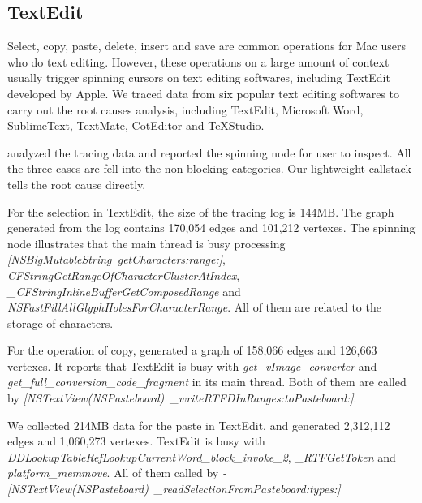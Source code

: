 \subsection{TextEdit}

Select, copy, paste, delete, insert and save are common operations for Mac
users who do text editing. However, these operations on a large amount of
context usually trigger spinning cursors on text editing softwares, including
TextEdit developed by Apple. We traced data from six popular text editing
softwares to carry out the root causes analysis, including TextEdit, Microsoft
Word, SublimeText, TextMate, CotEditor and TeXStudio.

\xxx analyzed the tracing data and reported the spinning node for user to
inspect.  All the three cases are fell into the non-blocking categories.  Our
lightweight callstack tells the root cause directly.

For the selection in TextEdit, the size of the tracing log is 144MB.  The graph
generated from the log contains 170,054 edges and 101,212 vertexes.  The
spinning node illustrates that the main thread is busy processing
\textit{[NSBigMutableString\ getCharacters:range:]},
\textit{CFStringGetRangeOfCharacterClusterAtIndex},
\textit{\_CFStringInlineBufferGetComposedRange} and
\textit{NSFastFillAllGlyphHolesForCharacterRange}.  All of them are related to
the storage of characters.

For the operation of copy, \xxx generated a graph of 158,066 edges and 126,663
vertexes.  It reports that TextEdit is busy with
\textit{get\_vImage\_converter} and
\textit{get\_full\_conversion\_code\_fragment} in its main thread.  Both of
them are called by \textit{[NSTextView(NSPasteboard)\
\_writeRTFDInRanges:toPasteboard:]}.

We collected 214MB data for the paste in TextEdit, and generated 2,312,112
edges and 1,060,273 vertexes. TextEdit is busy with
\textit{DDLookupTableRefLookupCurrentWord\_block\_invoke\_2},
\textit{\_RTFGetToken} and \textit{platform\_memmove}. All of them called by
\textit{-[NSTextView(NSPasteboard)\ \_readSelectionFromPasteboard:types:]}
